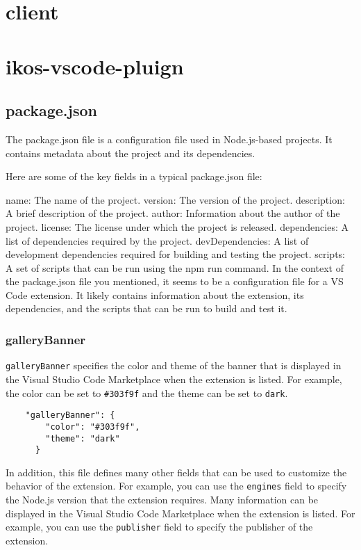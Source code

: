 \documentclass[12pt]{article}
\begin{document}
\section{client}

\section{ikos-vscode-pluign}
\subsection{package.json}
The package.json file is a configuration file used in Node.js-based projects. It contains metadata about the project and its dependencies.

Here are some of the key fields in a typical package.json file:

name: The name of the project.
version: The version of the project.
description: A brief description of the project.
author: Information about the author of the project.
license: The license under which the project is released.
dependencies: A list of dependencies required by the project.
devDependencies: A list of development dependencies required for building and testing the project.
scripts: A set of scripts that can be run using the npm run command.
In the context of the package.json file you mentioned, it seems to be a configuration file for a VS Code extension. It likely contains information about the extension, its dependencies, and the scripts that can be run to build and test it.

\subsubsection{galleryBanner}
\texttt{galleryBanner} specifies the color and theme of the banner that is displayed in the Visual Studio Code Marketplace when the extension is listed. For example, the color can be set to \texttt{\#303f9f} and the theme can be set to \texttt{dark}.
\begin{lstlisting}
    "galleryBanner": {
        "color": "#303f9f",
        "theme": "dark"
      }
\end{lstlisting}

In addition, this file defines many other fields that can be used to customize the behavior of the extension. For example, you can use the \texttt{engines} field to specify the Node.js version that the extension requires. Many information can be displayed in the Visual Studio Code Marketplace when the extension is listed. For example, you can use the \texttt{publisher} field to specify the publisher of the extension.
\end{document}
